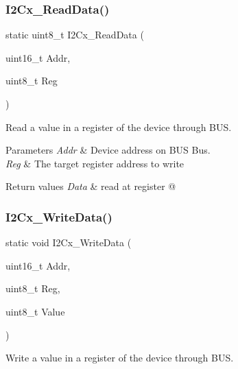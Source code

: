 \subsubsection{\texorpdfstring{I2\+Cx\+\_\+\+Read\+Data()}{I2Cx\_ReadData()}}
{\footnotesize\ttfamily static uint8\+\_\+t I2\+Cx\+\_\+\+Read\+Data (\begin{DoxyParamCaption}\item[{uint16\+\_\+t}]{Addr,  }\item[{uint8\+\_\+t}]{Reg }\end{DoxyParamCaption})\hspace{0.3cm}{\ttfamily [static]}}



Read a value in a register of the device through B\+US. 


\begin{DoxyParams}{Parameters}
{\em Addr} & Device address on B\+US Bus. \\
\hline
{\em Reg} & The target register address to write \\
\hline
\end{DoxyParams}

\begin{DoxyRetVals}{Return values}
{\em Data} & read at register @ \\
\hline
\end{DoxyRetVals}
\mbox{\label{group__STM32F3__DISCOVERY__BUS_ga073ead3d65fe41a407171480f9c0b74e}} 
\subsubsection{\texorpdfstring{I2\+Cx\+\_\+\+Write\+Data()}{I2Cx\_WriteData()}}
{\footnotesize\ttfamily static void I2\+Cx\+\_\+\+Write\+Data (\begin{DoxyParamCaption}\item[{uint16\+\_\+t}]{Addr,  }\item[{uint8\+\_\+t}]{Reg,  }\item[{uint8\+\_\+t}]{Value }\end{DoxyParamCaption})\hspace{0.3cm}{\ttfamily [static]}}



Write a value in a register of the device through B\+US. 


